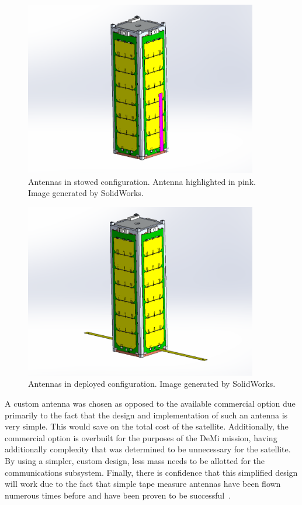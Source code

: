 \documentclass[12pt]{article}
\begin{document}
\begin{figure}[!ht]
\centering
\includegraphics[width=4in]{images/STR-4-Revised.png}
\caption{Antennas in stowed configuration. Antenna highlighted in pink. Image generated by SolidWorks.}
\label{fig:str-4}
\end{figure}

\begin{figure}[!ht]
\centering
\includegraphics[width=4in]{images/STR-5-Revised.png}
\caption{Antennas in deployed configuration. Image generated by SolidWorks.}
\label{fig:str-5}
\end{figure}

A custom antenna was chosen as opposed to the available commercial option due primarily to the fact that the design and implementation of such an antenna is very simple. This would save on the total cost of the satellite. Additionally, the commercial option is overbuilt for the purposes of the DeMi mission, having additionally complexity that was determined to be unnecessary for the satellite. By using a simpler, custom design, less mass needs to be allotted for the communications subsystem. Finally, there is confidence that this simplified design will work due to the fact that simple tape measure antennas have been flown numerous times before and have been proven to be successful~\cite{uhf-cubesat, cubesat-leo}.
\end{document}
